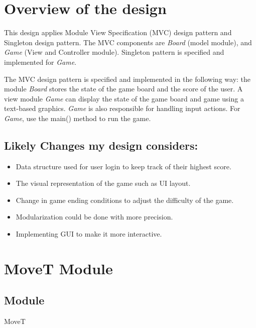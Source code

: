 \documentclass[12pt]{article}
\begin{document}
\newpage

\section{Overview of the design}

This design applies Module View Specification (MVC) design pattern and Singleton design pattern. The MVC components
are \textit{Board} (model module), and \textit{Game} (View and Controller module).
Singleton pattern is specified and implemented for \textit{Game}.

\medskip
The MVC design pattern is specified and implemented in the following way: the module \textit{Board} stores the state of the game board and the score of the user. A view module \textit{Game} can display the state of the game board and game using a text-based graphics. \textit{Game} is also responsible for handling input actions. For \textit{Game}, use the main() method to run the game.

\vspace{5cm}

\subsection*{Likely Changes my design considers:}

\begin{itemize}
  \item Data structure used for user login to keep track of their highest score.
  \item The visual representation of the game such as UI layout.
  \item Change in game ending conditions to adjust the difficulty of the game.
  \item Modularization could be done with more precision.
  \item Implementing GUI to make it more interactive.
\end{itemize}

\newpage

\section* {MoveT Module}

\subsection*{Module}

MoveT
\end{document}
